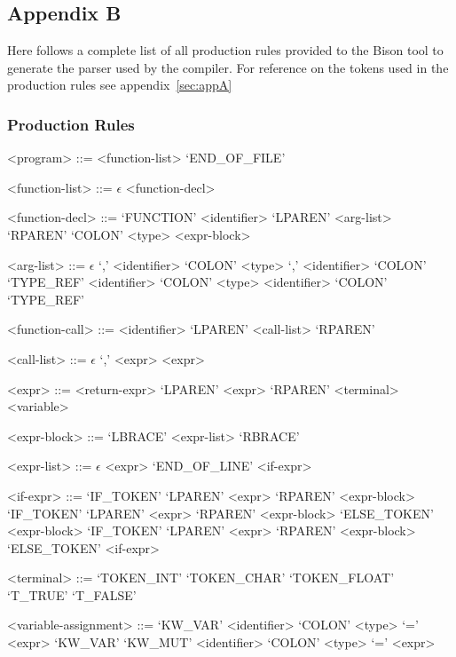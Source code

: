 \subsection{Appendix B}
\label{sec:appB}

Here follows a complete list of all production rules provided to the Bison tool to
generate the parser used by the \lang{} compiler. For reference on the tokens used in
the production rules see appendix~\ref{sec:appA}

\subsubsection*{Production Rules}

\begin{grammar}
<program> ::= <function-list> `END_OF_FILE'

<function-list> ::= $\epsilon$
 <function-decl>

<function-decl> ::= `FUNCTION' <identifier> `LPAREN' <arg-list> `RPAREN' `COLON' <type> <expr-block>

<arg-list> ::= $\epsilon$
 `,' <identifier> `COLON' <type>
 `,' <identifier> `COLON' `TYPE_REF'
\alt <identifier> `COLON' <type>
\alt <identifier> `COLON' `TYPE_REF'

<function-call> ::= <identifier> `LPAREN' <call-list> `RPAREN'

<call-list> ::= $\epsilon$
 `,' <expr>
\alt <expr>

<expr> ::= <return-expr>
\alt `LPAREN' <expr> `RPAREN'
\alt <terminal>
\alt <variable>

<expr-block> ::= `LBRACE' <expr-list> `RBRACE'

<expr-list> ::= $\epsilon$
 <expr> `END_OF_LINE'
 <if-expr>

<if-expr> ::= `IF_TOKEN' `LPAREN' <expr> `RPAREN' <expr-block>
\alt `IF_TOKEN' `LPAREN' <expr> `RPAREN' <expr-block> `ELSE_TOKEN' <expr-block>
\alt `IF_TOKEN' `LPAREN' <expr> `RPAREN' <expr-block> `ELSE_TOKEN' <if-expr>

<terminal> ::= `TOKEN_INT'
\alt `TOKEN_CHAR'
\alt `TOKEN_FLOAT'
\alt `T_TRUE'
\alt `T_FALSE'

<variable-assignment> ::= `KW_VAR' <identifier> `COLON' <type> `=' <expr>
\alt `KW_VAR' `KW_MUT' <identifier> `COLON' <type> `=' <expr>


\end{grammar}
